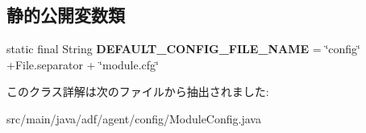 \subsection*{静的公開変数類}
\begin{DoxyCompactItemize}
\item 
\hypertarget{classadf_1_1agent_1_1config_1_1ModuleConfig_ab5bcec06ba1b09f1bb48b59c5fa58ac8}{}\label{classadf_1_1agent_1_1config_1_1ModuleConfig_ab5bcec06ba1b09f1bb48b59c5fa58ac8} 
static final String {\bfseries D\+E\+F\+A\+U\+L\+T\+\_\+\+C\+O\+N\+F\+I\+G\+\_\+\+F\+I\+L\+E\+\_\+\+N\+A\+ME} = \char`\"{}config\char`\"{} +File.\+separator + \char`\"{}module.\+cfg\char`\"{}
\end{DoxyCompactItemize}


このクラス詳解は次のファイルから抽出されました\+:\begin{DoxyCompactItemize}
\item 
src/main/java/adf/agent/config/Module\+Config.\+java\end{DoxyCompactItemize}
